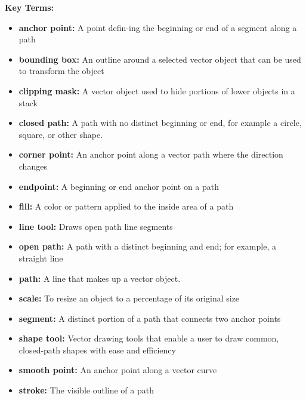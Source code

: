 \documentclass{report}
\begin{document}
    \bigbreak \noindent \bigbreak \noindent 
    \begin{Large}
        \textbf{Key Terms:}
    \end{Large}
    \bigbreak \noindent 
    \begin{itemize}
      \item \textbf{anchor point:} A point defin-ing the beginning or end of a segment along a path
      \item \textbf{bounding box:} An outline around a selected vector object that can be used to transform the object
      \item \textbf{clipping mask:} A vector object used to hide portions of lower objects in a stack
      \item \textbf{closed path:} A path with no distinct beginning or end, for example a circle, square, or other shape.
      \item \textbf{corner point:} An anchor point along a vector path where the direction changes
      \item \textbf{endpoint:} A beginning or end anchor point on a path
      \item \textbf{fill:} A color or pattern applied to the inside area of a path
      \item \textbf{line tool:} Draws open path line segments
      \item \textbf{open path:} A path with a distinct beginning and end; for example, a straight line
      \item \textbf{path:} A line that makes up a vector object.
      \item \textbf{scale:} To resize an object to a percentage of its original size
      \item \textbf{segment:} A  distinct portion of a path that  connects two anchor points
      \item \textbf{shape tool:} Vector  drawing tools that enable a user to draw common, closed-path shapes with ease and efficiency
      \item \textbf{smooth point:} An  anchor point along a vector curve
      \item \textbf{stroke:} The visible outline of a path
    \end{itemize}
\end{document}
